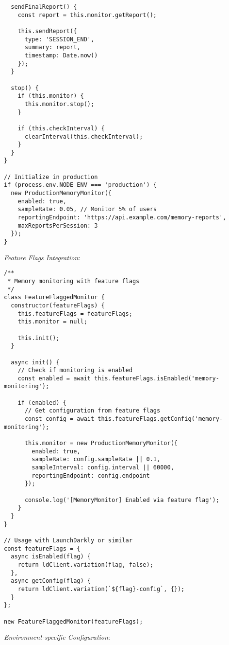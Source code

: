 \documentclass[11pt]{article}
\begin{document}
\begin{verbatim}
  sendFinalReport() {
    const report = this.monitor.getReport();
    
    this.sendReport({
      type: 'SESSION_END',
      summary: report,
      timestamp: Date.now()
    });
  }
  
  stop() {
    if (this.monitor) {
      this.monitor.stop();
    }
    
    if (this.checkInterval) {
      clearInterval(this.checkInterval);
    }
  }
}

// Initialize in production
if (process.env.NODE_ENV === 'production') {
  new ProductionMemoryMonitor({
    enabled: true,
    sampleRate: 0.05, // Monitor 5% of users
    reportingEndpoint: 'https://api.example.com/memory-reports',
    maxReportsPerSession: 3
  });
}
\end{verbatim}

\emph{Feature Flags Integration}:

\begin{verbatim}
/**
 * Memory monitoring with feature flags
 */
class FeatureFlaggedMonitor {
  constructor(featureFlags) {
    this.featureFlags = featureFlags;
    this.monitor = null;
    
    this.init();
  }
  
  async init() {
    // Check if monitoring is enabled
    const enabled = await this.featureFlags.isEnabled('memory-monitoring');
    
    if (enabled) {
      // Get configuration from feature flags
      const config = await this.featureFlags.getConfig('memory-monitoring');
      
      this.monitor = new ProductionMemoryMonitor({
        enabled: true,
        sampleRate: config.sampleRate || 0.1,
        sampleInterval: config.interval || 60000,
        reportingEndpoint: config.endpoint
      });
      
      console.log('[MemoryMonitor] Enabled via feature flag');
    }
  }
}

// Usage with LaunchDarkly or similar
const featureFlags = {
  async isEnabled(flag) {
    return ldClient.variation(flag, false);
  },
  async getConfig(flag) {
    return ldClient.variation(`${flag}-config`, {});
  }
};

new FeatureFlaggedMonitor(featureFlags);
\end{verbatim}

\emph{Environment-specific Configuration}:
\end{document}

